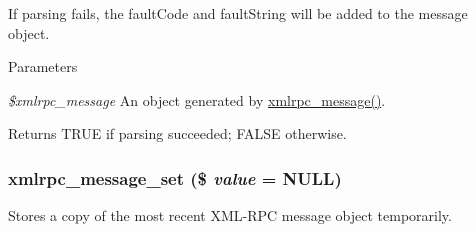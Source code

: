 If parsing fails, the faultCode and faultString will be added to the message object.


\begin{DoxyParams}{Parameters}
\item[{\em \$xmlrpc\_\-message}]An object generated by \hyperlink{xmlrpc_8inc_a623f37020bfae3dec50facefc4cdcdac}{xmlrpc\_\-message()}.\end{DoxyParams}
\begin{DoxyReturn}{Returns}
TRUE if parsing succeeded; FALSE otherwise. 
\end{DoxyReturn}
\hypertarget{xmlrpc_8inc_a82e3428ca6ed8e4d1ddc377fbc77d8dc}{
\subsubsection[{xmlrpc\_\-message\_\-set}]{\setlength{\rightskip}{0pt plus 5cm}xmlrpc\_\-message\_\-set (\$ {\em value} = {\ttfamily NULL})}}
\label{xmlrpc_8inc_a82e3428ca6ed8e4d1ddc377fbc77d8dc}
Stores a copy of the most recent XML-\/RPC message object temporarily.


